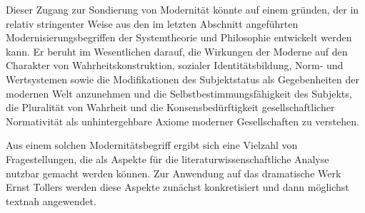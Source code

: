 Dieser Zugang zur Sondierung von Modernität könnte auf einem \Cite{normativen
  Begriff von Modernität und modernem
  Bewußtsein} gründen, der in relativ
stringenter Weise aus den im letzten Abschnitt angeführten
Modernisierungsbegriffen der Systemtheorie und Philosophie entwickelt werden
kann. Er beruht im Wesentlichen darauf, die Wirkungen der Moderne auf den
Charakter von Wahrheitskonstruktion, sozialer Identitätsbildung, Norm- und
Wertsystemen sowie die Modifikationen des Subjektstatus als Gegebenheiten der
modernen Welt anzunehmen und die Selbstbestimmungsfähigkeit des Subjekts, die
Pluralität von Wahrheit und die Konsensbedürftigkeit gesellschaftlicher
Normativität als unhintergehbare Axiome moderner Gesellschaften zu verstehen.

Aus einem solchen Modernitätsbegriff ergibt sich eine Vielzahl von
Fragestellungen, die als Aspekte für die literaturwissenschaftliche Analyse
nutzbar gemacht werden können. Zur Anwendung auf das dramatische Werk Ernst
Tollers werden diese Aspekte zunächst konkretisiert und dann möglichst textnah
angewendet.

